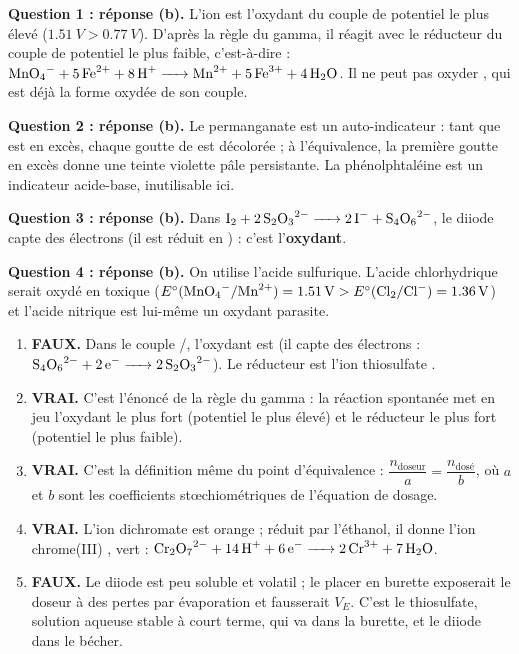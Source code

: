 \documentclass[11pt]{article}
\newcommand{\cle}[1]{{\popxbold\color{popdark}#1}}
\begin{document}
\begin{corrige}
\textbf{Question 1 : réponse (b).} L'ion  est l'oxydant du couple de potentiel le plus élevé ($\SI{1,51}{V} > \SI{0,77}{V}$). D'après la règle du gamma, il réagit avec le réducteur du couple de potentiel le plus faible, c'est-à-dire  : $\ce{MnO4- + 5Fe^2+ + 8H+ -> Mn^2+ + 5Fe^3+ + 4H2O}$. Il ne peut pas oxyder , qui est déjà la forme oxydée de son couple.

\textbf{Question 2 : réponse (b).} Le permanganate est un \cle{auto-indicateur} : tant que  est en excès, chaque goutte de  est décolorée ; à l'équivalence, la première goutte en excès donne une teinte violette pâle persistante. La phénolphtaléine est un indicateur acide-base, inutilisable ici.

\textbf{Question 3 : réponse (b).} Dans $\ce{I2 + 2S2O3^2- -> 2I- + S4O6^2-}$, le diiode capte des électrons (il est réduit en ) : c'est l'\textbf{oxydant}.

\textbf{Question 4 : réponse (b).} On utilise l'acide sulfurique. L'acide chlorhydrique serait oxydé en  toxique ($E^\circ(\ce{MnO4-}/\ce{Mn^2+}) = \SI{1,51}{V} > E^\circ(\ce{Cl2}/\ce{Cl-}) = \SI{1,36}{V}$) et l'acide nitrique est lui-même un oxydant parasite.
\end{corrige}

\begin{corrige}
\begin{enumerate}
\item \textbf{FAUX.} Dans le couple /, l'oxydant est  (il capte des électrons : $\ce{S4O6^2- + 2e- -> 2S2O3^2-}$). Le réducteur est l'ion thiosulfate .
\item \textbf{VRAI.} C'est l'énoncé de la règle du gamma : la réaction spontanée met en jeu l'oxydant le plus fort (potentiel le plus élevé) et le réducteur le plus fort (potentiel le plus faible).
\item \textbf{VRAI.} C'est la définition même du point d'équivalence : $\dfrac{n_{\text{doseur}}}{a} = \dfrac{n_{\text{dosé}}}{b}$, où $a$ et $b$ sont les coefficients stœchiométriques de l'équation de dosage.
\item \textbf{VRAI.} L'ion dichromate  est orange ; réduit par l'éthanol, il donne l'ion chrome(III) , vert : $\ce{Cr2O7^2- + 14H+ + 6e- -> 2Cr^3+ + 7H2O}$.
\item \textbf{FAUX.} Le diiode est peu soluble et volatil ; le placer en burette exposerait le doseur à des pertes par évaporation et fausserait $V_E$. C'est le thiosulfate, solution aqueuse stable à court terme, qui va dans la burette, et le diiode dans le bécher.
\end{enumerate}
\end{corrige}
\end{document}
